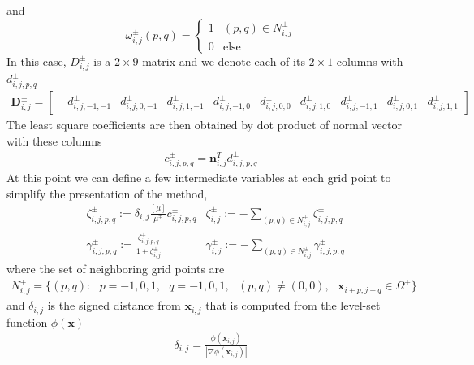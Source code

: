\documentclass{elsarticle}
\begin{document}
and
\begin{equation}
	\omega_{i,j}^\pm (p,q) = \begin{cases}
		1 & (p,q)\in N_{i,j}^\pm \\
		0 & \text{else}
	\end{cases}
\end{equation}
In this case, $D^\pm_{i,j}$ is a $2\times 9$ matrix and we denote each of its $2\times 1$ columns with $d^\pm_{i,j,p,q}$
\begin{align*}
	\mathbf{D}^\pm_{i,j}  = \begin{bmatrix}
		 & d^\pm_{i,j,-1,-1} & d^\pm_{i,j,0,-1} & d^\pm_{i,j,1,-1} & d^\pm_{i,j,-1,0} & d^\pm_{i,j,0,0} & d^\pm_{i,j,1,0} & d^\pm_{i,j,-1,1} & d^\pm_{i,j,0,1} & d^\pm_{i,j,1,1}
	\end{bmatrix}
\end{align*}
The least square coefficients are then obtained by dot product of normal vector with these columns
\begin{align*}
	c^\pm_{i,j,p,q} = \mathbf{n}_{i,j}^T  d^\pm_{i,j,p,q}
\end{align*}
At this point we can define a few intermediate variables at each grid point to simplify the presentation of the method,
\begin{align*}
	 & \zeta_{i,j,p,q}^\pm := \delta_{i,j} \frac{[\mu]}{\mu^\mp}c_{i,j,p,q}^\pm  & \zeta_{i,j}^\pm := -\sum_{(p,q)\in N_{i,j}^\pm} \zeta_{i,j,p,q}^\pm   \\
	 & \gamma_{i,j,p,q}^\pm := \frac{\zeta_{i,j,p,q}^\pm}{1 \pm \zeta^\pm_{i,j}} & \gamma^\pm_{i,j} := -\sum_{(p,q)\in N_{i,j}^\pm} \gamma_{i,j,p,q}^\pm
\end{align*}
where the set of neighboring grid points are
\begin{align*}
	N_{i,j}^\pm = \{(p,q) :\ \ \  p=-1,0,1, \ \ \  q=-1,0,1, \ \ \ (p,q)\neq (0,0), \ \ \ \mathbf{x}_{i+p,j+q}\in \Omega^\pm \}
\end{align*}
and $\delta_{i,j}$ is the signed distance from $\mathbf{x}_{i,j}$ that is computed from the level-set function $\phi(\mathbf{x})$
\begin{align*}
	\delta_{i,j}=\frac{\phi(\mathbf{x}_{i,j})}{|\nabla \phi(\mathbf{x}_{i,j})|}
\end{align*}
\end{document}
